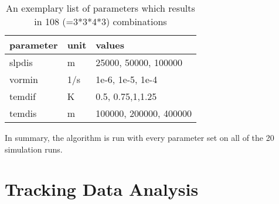 \begin{table}[ht]
	\centering
	\begin{tabular}{|l|l|l|}
		\hline
		\textbf{parameter} & \textbf{unit} & \textbf{values}        \\ \hline
		slpdis             & m             & 25000, 50000, 100000   \\
		vormin             & 1/s           & 1e-6, 1e-5, 1e-4       \\
		temdif             & K             & 0.5, 0.75,1,1.25       \\
		temdis             & m             & 100000, 200000, 400000 \\ \hline
	\end{tabular}
	\caption{An exemplary list of parameters which results in 108 (=3*3*4*3) combinations }
	\label{tab:param_combos}
\end{table}
In summary, the algorithm is run with every parameter set on all of the 20
simulation runs.

\section{Tracking Data Analysis}
